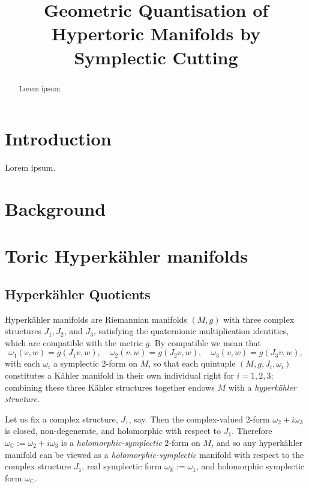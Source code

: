 \documentclass{amsart}
\title{Geometric Quantisation of Hypertoric Manifolds by Symplectic Cutting}
\date{}	%
\newcommand{\w}{\omega}
\newcommand{\RR}{\mathbb{R}}
\newcommand{\CC}{\mathbb{C}}
\begin{document}
	\maketitle
	
	\begin{abstract}
		Lorem ipsum.
	\end{abstract}
	
	\section{Introduction}
	
	Lorem ipsum.
	
	\section{Background}
	
	\section{Toric Hyperk\"ahler manifolds}
	
	\subsection{Hyperk\"ahler Quotients}
	
	Hyperk\"ahler manifolds are Riemannian manifolds $(M,g)$ with three complex structures $J_{1}, J_{2}$, and $J_{3}$, satisfying the quaternionic multiplication identities, which are compatible with the metric $g$. By compatible we mean that
	\[
		\w_{1}(v,w) = g(J_{1}v,w),\quad \w_{2}(v,w) = g(J_{2}v,w),\quad \w_{3}(v,w) = g(J_{3}v,w),
	\]
	with each $\w_{i}$ a symplectic $2$-form on $M$, so that each quintuple $(M, g, J_{i}, \w_{i})$ constitutes a K\"ahler manifold in their own individual right for $i = 1, 2, 3$; combining these three K\"ahler structures together endows $M$ with a \emph{hyperk\"ahler structure}.
		
	Let us fix a complex structure, $J_{1}$, say. Then the complex-valued $2$-form $\w_{2} + i\w_{3}$ is closed, non-degenerate, and holomorphic with respect to $J_{1}$. Therefore $\w_{\CC} := \w_{2} + i\w_{3}$ is a \emph{holomorphic-symplectic} $2$-form on $M$, and so any hyperk\"ahler manifold can be viewed as a \emph{holomorphic-symplectic} manifold with respect to the complex structure $J_{1}$, real symplectic form $\w_{\RR} := \w_{1}$, and holomorphic symplectic form $\w_{\CC}$.
	
\end{document}
